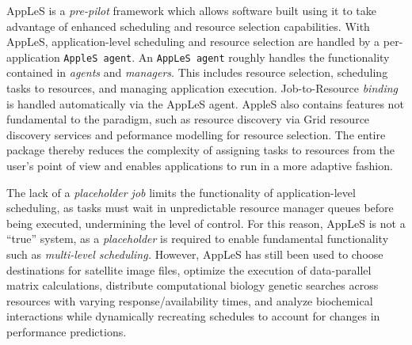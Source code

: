 \documentclass{sig-alternate}
\begin{document}
AppLeS is a \textit{pre-pilot} framework which allows software built using it to take advantage
of enhanced scheduling and resource selection capabilities.
With AppLeS, application-level scheduling and resource selection are handled by a
per-application \texttt{AppleS agent}.
An \texttt{AppLeS agent} roughly handles the \pilotjob functionality contained in
\textit{\pilotjob agents} and \textit{managers}.  This includes resource
selection, scheduling tasks to resources, and managing application execution.
Job-to-Resource \textit{binding} is handled automatically via the AppLeS agent.
AppleS also contains features not fundamental to the \pilotjob paradigm, such
as resource discovery via Grid resource discovery services and peformance
modelling for resource selection.  The entire package thereby reduces the
complexity of assigning tasks to resources from the user's point of view
and enables applications to run in a more adaptive fashion.

The lack of a \textit{placeholder job} limits the functionality 
of application-level scheduling, as tasks
must wait in unpredictable resource manager queues before being executed,
undermining the level of control.  For this reason, AppLeS
is not a ``true'' \pilotjob system, as a \textit{placeholder}
is required to enable fundamental \pilotjob functionality such as
\textit{multi-level scheduling.}
However, AppLeS has still been used to choose destinations
for satellite image files, optimize the execution of data-parallel matrix
calculations, distribute computational biology genetic searches 
across resources with varying response/availability times, and
analyze biochemical interactions while dynamically recreating
schedules to account for changes in performance predictions.

\end{document}
